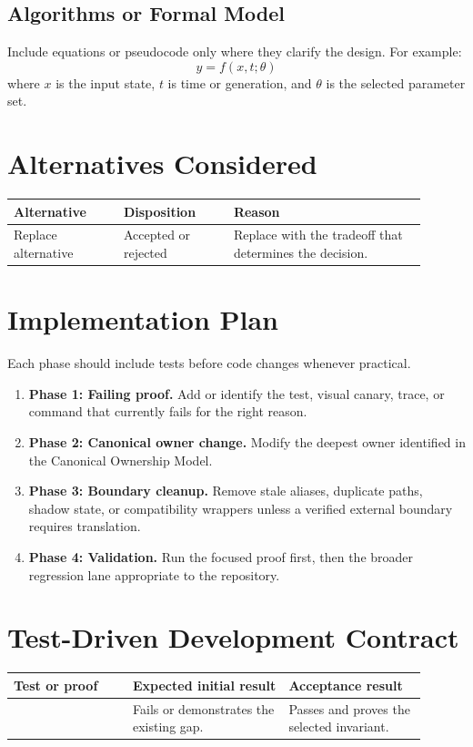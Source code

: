 \documentclass[11pt]{article}
\begin{document}
\subsection{Algorithms or Formal Model}
Include equations or pseudocode only where they clarify the design. For example:
\[
  y = f(x, t; \theta)
\]
where \(x\) is the input state, \(t\) is time or generation, and \(\theta\) is the selected parameter set.

\section{Alternatives Considered}
\begin{longtable}{L{0.24\linewidth}L{0.24\linewidth}L{0.42\linewidth}}
\toprule
\textbf{Alternative} & \textbf{Disposition} & \textbf{Reason} \\
\midrule
\endhead
Replace alternative & Accepted or rejected & Replace with the tradeoff that determines the decision. \\
\bottomrule
\end{longtable}

\section{Implementation Plan}
Each phase should include tests before code changes whenever practical.

\begin{enumerate}
  \item \textbf{Phase 1: Failing proof.} Add or identify the test, visual canary, trace, or command that currently fails for the right reason.
  \item \textbf{Phase 2: Canonical owner change.} Modify the deepest owner identified in the Canonical Ownership Model.
  \item \textbf{Phase 3: Boundary cleanup.} Remove stale aliases, duplicate paths, shadow state, or compatibility wrappers unless a verified external boundary requires translation.
  \item \textbf{Phase 4: Validation.} Run the focused proof first, then the broader regression lane appropriate to the repository.
\end{enumerate}

\section{Test-Driven Development Contract}
\begin{longtable}{L{0.26\linewidth}L{0.34\linewidth}L{0.30\linewidth}}
\toprule
\textbf{Test or proof} & \textbf{Expected initial result} & \textbf{Acceptance result} \\
\midrule
\endhead
{} & Fails or demonstrates the existing gap. & Passes and proves the selected invariant. \\
\bottomrule
\end{longtable}
\end{document}
